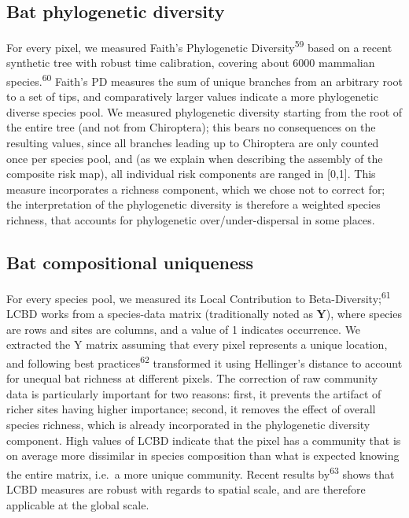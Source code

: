 \documentclass[10pt,oneside]{article}
\begin{document}
\hypertarget{bat-phylogenetic-diversity}{%
\subsection{Bat phylogenetic
diversity}\label{bat-phylogenetic-diversity}}

For every pixel, we measured Faith's Phylogenetic
Diversity\textsuperscript{59} based on a recent synthetic tree with
robust time calibration, covering about 6000 mammalian
species.\textsuperscript{60} Faith's PD measures the sum of unique
branches from an arbitrary root to a set of tips, and comparatively
larger values indicate a more phylogenetic diverse species pool. We
measured phylogenetic diversity starting from the root of the entire
tree (and not from Chiroptera); this bears no consequences on the
resulting values, since all branches leading up to Chiroptera are only
counted once per species pool, and (as we explain when describing the
assembly of the composite risk map), all individual risk components are
ranged in {[}0,1{]}. This measure incorporates a richness component,
which we chose not to correct for; the interpretation of the
phylogenetic diversity is therefore a weighted species richness, that
accounts for phylogenetic over/under-dispersal in some places.

\hypertarget{bat-compositional-uniqueness}{%
\subsection{Bat compositional
uniqueness}\label{bat-compositional-uniqueness}}

For every species pool, we measured its Local Contribution to
Beta-Diversity;\textsuperscript{61} LCBD works from a species-data
matrix (traditionally noted as \(\mathbf{Y}\)), where species are rows
and sites are columns, and a value of 1 indicates occurrence. We
extracted the Y matrix assuming that every pixel represents a unique
location, and following best practices\textsuperscript{62} transformed
it using Hellinger's distance to account for unequal bat richness at
different pixels. The correction of raw community data is particularly
important for two reasons: first, it prevents the artifact of richer
sites having higher importance; second, it removes the effect of overall
species richness, which is already incorporated in the phylogenetic
diversity component. High values of LCBD indicate that the pixel has a
community that is on average more dissimilar in species composition than
what is expected knowing the entire matrix, i.e.~a more unique
community. Recent results by\textsuperscript{63} shows that LCBD
measures are robust with regards to spatial scale, and are therefore
applicable at the global scale.
\end{document}
